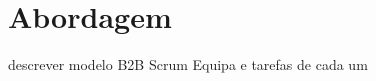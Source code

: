 \chapter{Abordagem}
\label{sec:abordagem}

descrever modelo B2B
Scrum
Equipa e tarefas de cada um 

\blankpage

\glsresetall



